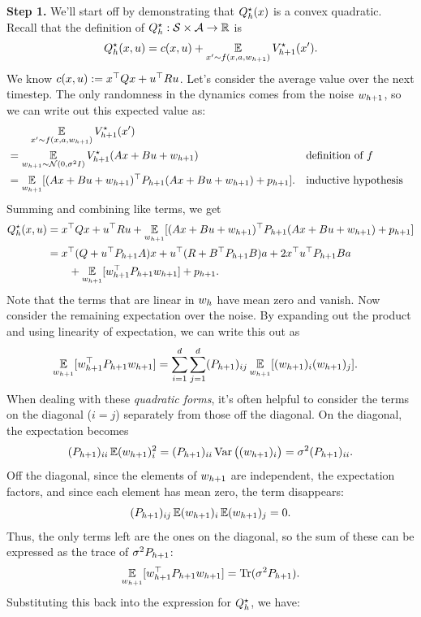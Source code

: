 \documentclass[../main/main]{subfiles}
\begin{document}
\textbf{Step 1.} We'll start off by demonstrating that $Q^\star_h(x)$ is a convex quadratic.
Recall that the definition of $Q^\star_h : \mathcal{S} \times \mathcal{A} \to \mathbb{R}$ is \[
    Q^\star_h(x, u) = c(x, u) + \operatorname*{\mathbb{E}}_{x' \sim f(x, a, w_{h+1})} V^\star_{h+1}(x').
\]
We know $c(x, u) := x^\top Q x + u^\top R u$. Let's consider the average value
over the next timestep. The only randomness in the dynamics comes from the noise
$w_{h+1}$, so we can write out this expected value as:
\begin{align*}
    &\qquad \operatorname*{\mathbb{E}}_{x' \sim f(x, a, w_{h+1})} V^\star_{h+1}(x') \\
    &= \operatorname*{\mathbb{E}}_{w_{h+1} \sim \mathcal{N}(0, \sigma^2 I)} V^\star_{h+1}(A x + B u + w_{h+1}) && \text{definition of } f \\
    &= \operatorname*{\mathbb{E}}_{w_{h+1}} [ (A x + B u + w_{h+1})^\top P_{h+1} (A x + B u + w_{h+1}) + p_{h+1} ]. && \text{inductive hypothesis}
\end{align*}
Summing and combining like terms, we get \begin{align*}
    Q^\star_h(x, u) &= x^\top Q x + u^\top R u + \operatorname*{\mathbb{E}}_{w_{h+1}} [(A x + B u + w_{h+1})^\top P_{h+1} (A x + B u + w_{h+1}) + p_{h+1}] \\
    &= x^\top (Q + u^\top P_{h+1} A)x + u^\top (R + B^\top P_{h+1} B) a + 2 x^\top u^\top P_{h+1} B a \\
    &\qquad + \operatorname*{\mathbb{E}}_{w_{h+1}} [w_{h+1}^\top P_{h+1} w_{h+1}] + p_{h+1}.
\end{align*}
Note that the terms that are linear in $w_h$ have mean zero and vanish.
Now consider the remaining expectation over the noise. By expanding out the product and using linearity of
expectation, we can write this out as \begin{align*}
    \operatorname*{\mathbb{E}}_{w_{h+1}} [w_{h+1}^\top P_{h+1} w_{h+1}] &= \sum_{i=1}^d \sum_{j=1}^d (P_{h+1})_{ij} \operatorname*{\mathbb{E}}_{w_{h+1}} [(w_{h+1})_i (w_{h+1})_j].
\end{align*}
When dealing with these \emph{quadratic forms}, it's often helpful to consider the terms
on the diagonal ($i = j$) separately from those off the diagonal. On the diagonal, the
expectation becomes \[ (P_{h+1})_{ii} \operatorname*{\mathbb{E}} (w_{h+1})_i^2 = (P_{h+1})_{ii} \operatorname*{\textrm{Var}} \big((w_{h+1})_i \big) = \sigma^2 (P_{h+1})_{ii}. \]
Off the diagonal, since the elements of $w_{h+1}$ are independent,
the expectation factors, and since each element has mean zero, the term disappears: \[ (P_{h+1})_{ij} \operatorname*{\mathbb{E}} (w_{h+1})_i \operatorname*{\mathbb{E}} (w_{h+1})_j = 0. \]
Thus, the only terms left are the ones on the diagonal, so the sum of these can
be expressed as the trace of $\sigma^2 P_{h+1}$: \[
    \operatorname*{\mathbb{E}}_{w_{h+1}} [w_{h+1}^\top P_{h+1} w_{h+1}] = \operatorname*{\textrm{Tr}}(\sigma^2 P_{h+1}).
\]
Substituting this back into the expression for $Q^\star_h$, we have:
\end{document}
